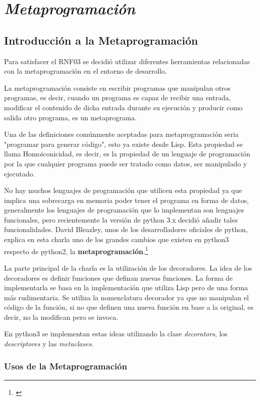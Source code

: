 \documentclass{cosas/tfg_domingo}
\begin{document}
\chapter{\emph{Metaprogramación}}

\section{Introducción a la Metaprogramación}

Para satisfacer el RNF03 se decidió utilizar diferentes herramientas relacionadas con la metaprogramación en el entorno de desarrollo.

La metaprogramación consiste en escribir programas que manipulan otros programas, es decir, cuando un programa es capaz de recibir una entrada, modificar el contenido de dicha entrada durante su ejecución y producir como salida otro programa, es un metaprograma.

Una de las definiciones comúnmente aceptadas para metaprogramación seria "programar para generar código", esto ya existe desde Lisp. 
Esta propiedad se llama Homoiconicidad, es decir, es la propiedad de un lenguaje de programación por la que cualquier programa puede ser tratado como datos, ser manipulado y ejecutado.

No hay muchos lenguajes de programación que utilicen esta propiedad ya que implica una sobrecarga en memoria poder tener el programa en forma de datos, generalmente los lenguajes de programación que lo implementan son lenguajes funcionales, pero recientemente la versión de python 3.x decidió añadir tales funcionalidades. David Bleazley, unos de los desarrolladores oficiales de python, explica en esta charla uno de los grandes cambios que existen en python3 respecto de python2, la \textbf{metaprogramación}.\footnote{\citep{David}}

La parte principal de la charla es la utilización de los decoradores. La idea de los decoradores es definir funciones que definan nuevas funciones. La forma de implementarla se basa en la implementación que utiliza Lisp pero de una forma más rudimentaria. Se utiliza la nomenclatura decorador ya que no manipulan el código de la función, si no que definen una nueva función en base a la original, es decir, no la modifican pero se invoca.

En python3 se implementan estas ideas utilizando la clase \textit{decorators}, los \textit{descriptores} y las \textit{metaclases}.

\subsection{Usos de la Metaprogramación}
\end{document}
